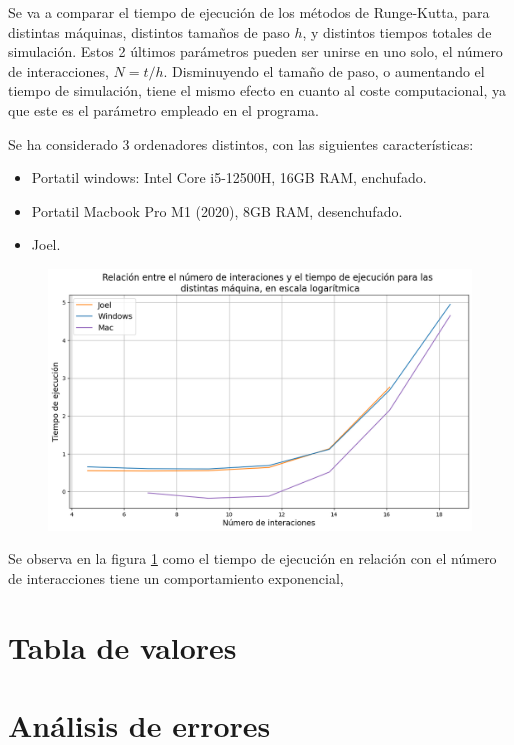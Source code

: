 \documentclass[11pt, twoside]{article} %
\begin{document}
Se va a comparar el tiempo de ejecución de los métodos de Runge-Kutta, para 
distintas máquinas, distintos tamaños de paso $h$, y distintos tiempos totales
de simulación. Estos 2 últimos parámetros pueden ser unirse en uno solo, 
el número de interacciones, $N = t/h$. Disminuyendo el tamaño de paso, o 
aumentando el tiempo de simulación, tiene el mismo efecto en cuanto al coste
computacional, ya que este es el parámetro empleado en el programa.

Se ha considerado 3 ordenadores distintos, con las siguientes características:
\begin{itemize}
    \item Portatil windows: Intel Core i5-12500H, 16GB RAM, enchufado.
    \item Portatil Macbook Pro M1 (2020), 8GB RAM, desenchufado.
    \item Joel.
\end{itemize}

\begin{figure}
    \centering
    \includegraphics[width=\linewidth]{plots/optimizacion.png}
    \caption{}
    \label{fig:optimizacion}
\end{figure}

Se observa en la figura \ref{fig:optimizacion} como el tiempo de ejecución
en relación con el número de interacciones tiene un comportamiento exponencial,


\newpage

\appendix

\section{Tabla de valores}


\newpage

\section{Análisis de errores}
\end{document}
